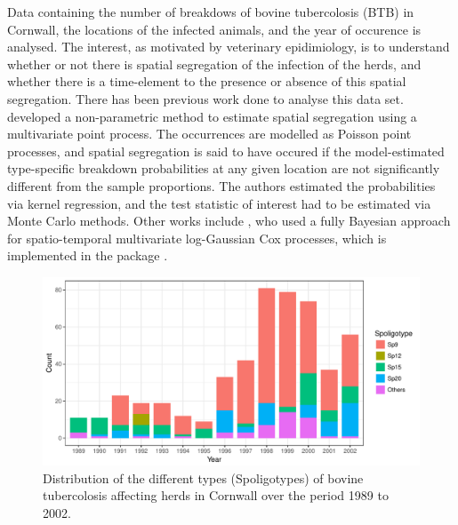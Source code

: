 \documentclass[showframe,11pt]{report}\usepackage[]{graphicx}\usepackage{xcolor}
\newenvironment{knitrout}{}{} %
\begin{document}
Data containing the number of breakdows of bovine tubercolosis (BTB) in Cornwall, the locations of the infected animals, and the year of occurence is analysed.
The interest, as motivated by veterinary epidimiology, is to understand whether or not there is spatial segregation of the infection of the herds, and whether there is a time-element to the presence or absence of this spatial segregation.
There has been previous work done to analyse this data set.
\citet{diggle2005nonparametric} developed a non-parametric method to estimate spatial segregation using a multivariate point process.
The occurrences are modelled as Poisson point processes, and spatial segregation is said to have occured if the model-estimated type-specific breakdown probabilities at any given location are not significantly different from the sample proportions.
The authors estimated the probabilities via kernel regression, and the test statistic of interest had to be estimated via Monte Carlo methods.
Other works include \citet{diggle2013spatial}, who used a fully Bayesian approach for spatio-temporal multivariate log-Gaussian Cox processes, which is implemented in the  package  \citep{taylor2013lgcp}.

\begin{knitrout}
\color{fgcolor}\begin{figure}[htb]

{\centering \includegraphics[width=\linewidth]{figure/05-plot_cow-1} 

}

\caption[Distribution of the different types (Spoligotypes) of bovine tubercolosis affecting herds in Cornwall over the period 1989 to 2002]{Distribution of the different types (Spoligotypes) of bovine tubercolosis affecting herds in Cornwall over the period 1989 to 2002.}\label{fig:plot.cow}
\end{figure}


\end{knitrout}
\end{document}
